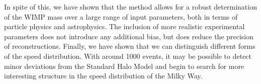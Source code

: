 In spite of this, we have shown that the method allows for a robust determination of the WIMP mass over a large range of input parameters, both in terms of particle physics and astrophysics. The inclusion of more realistic experimental parameters does not introduce any additional bias, but does reduce the precision of reconstructions. Finally, we have shown that we can distinguish different forms of the speed distribution. With around 1000 events, it may be possible to detect minor deviations from the Standard Halo Model and begin to search for more interesting structure in the speed distribution of the Milky Way.

